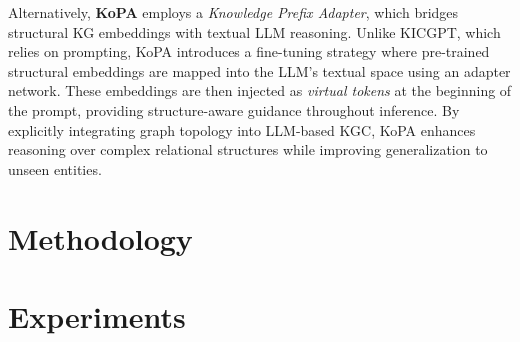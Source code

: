 \documentclass[12pt,a4paper]{article}
\begin{document}
Alternatively, \textbf{KoPA} \cite{qin2023kopa} employs a \textit{Knowledge Prefix Adapter}, which bridges structural KG embeddings with textual LLM reasoning. Unlike KICGPT, which relies on prompting, KoPA introduces a fine-tuning strategy where pre-trained structural embeddings are mapped into the LLM's textual space using an adapter network. These embeddings are then injected as \textit{virtual tokens} at the beginning of the prompt, providing structure-aware guidance throughout inference. By explicitly integrating graph topology into LLM-based KGC, KoPA enhances reasoning over complex relational structures while improving generalization to unseen entities.

%
%

\section{Methodology}\label{sec:methodology}

%
%

\section{Experiments}\label{sec:experiments}
\end{document}
